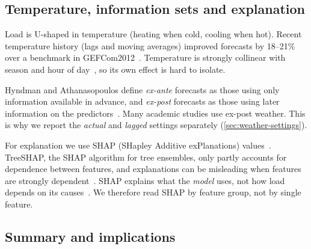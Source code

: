\subsection{Temperature, information sets and explanation}
\label{sec:lit-weather}

Load is U-shaped in temperature (heating when cold, cooling when hot). Recent temperature history
(lags and moving averages) improved forecasts by 18--21\% over a benchmark in
GEFCom2012~\cite{wang2016recency}. Temperature is strongly collinear with season and hour of
day~\cite{pelekis2023comparative}, so its own effect is hard to isolate.

Hyndman and Athanasopoulos define \emph{ex-ante} forecasts as those using only information
available in advance, and \emph{ex-post} forecasts as those using later information on the
predictors~\cite{hyndman2021fpp3}. Many academic studies use ex-post weather. This is why we report
the \emph{actual} and \emph{lagged} settings separately (\cref{sec:weather-settings}).

For explanation we use SHAP (SHapley Additive exPlanations)
values~\cite{lundberg2017unified}. TreeSHAP, the SHAP algorithm for tree ensembles, only partly accounts for
dependence between features, and explanations can be misleading when features are strongly
dependent~\cite{aas2021explaining}. SHAP explains what the \emph{model} uses, not how load depends
on its causes~\cite{chen2020true}. We therefore read SHAP by feature group, not by single feature.

\subsection{Summary and implications}
\label{sec:lit-summary}

